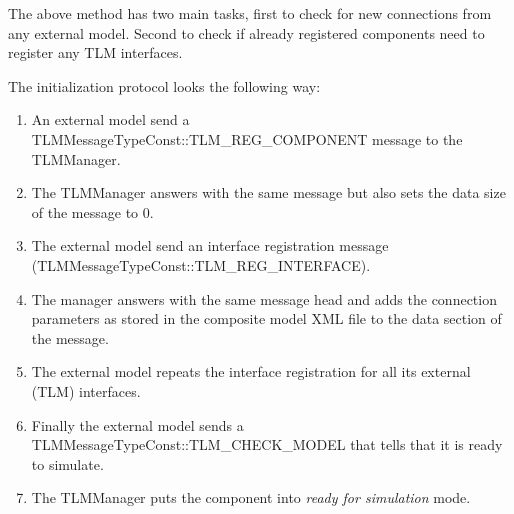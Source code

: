 The above method has two main tasks, first to check for new connections from any external model. 
Second to check if already registered components need to register any TLM interfaces.

The initialization protocol looks the following way:
\begin{enumerate}
\item An external model send a TLMMessageTypeConst::TLM\_REG\_COMPONENT message to the TLMManager.
\item The TLMManager answers with the same message but also sets the data size of the message to 0.
\item The external model send an interface registration message (TLMMessageTypeConst::TLM\_REG\_INTERFACE).
\item The manager answers with the same message head and adds the connection parameters as stored in the composite model XML file to the data section of the message.
\item The external model repeats the interface registration for all its external (TLM) interfaces.
\item Finally the external model sends a TLMMessageTypeConst::TLM\_CHECK\_MODEL that tells that it is ready to simulate.
\item The TLMManager puts the component into {\em ready for simulation} mode.
\end{enumerate}

